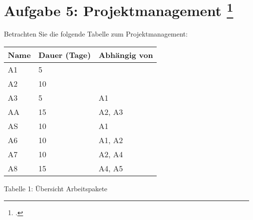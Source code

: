 \documentclass{bschlangaul-aufgabe}
\begin{document}

\section{Aufgabe 5: Projektmanagement
\footcite[Thema 1 Teilaufgabe 1 Aufgabe 5]{examen:46116:2017:03}}

Betrachten Sie die folgende Tabelle zum Projektmanagement:

\begin{center}
\begin{tabular}{|l|l|l|}
\hline
Name & Dauer (Tage) & Abhängig von\\\hline\hline
A1 & 5 & \\\hline
A2 & 10 & \\\hline
A3 & 5  & A1 \\\hline
AA & 15 & A2, A3\\\hline
AS & 10 & A1 \\\hline
A6 & 10 & A1, A2\\\hline
A7 & 10 & A2, A4\\\hline
A8 & 15 & A4, A5\\\hline
\end{tabular}
\end{center}

Tabelle 1: Übersicht Arbeitspakete
\end{document}
